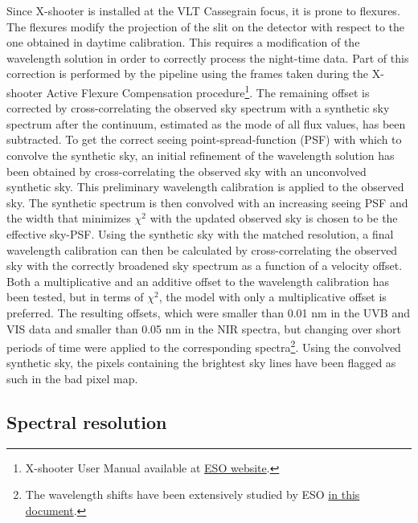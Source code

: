 \documentclass{aa}    %
\begin{document}
Since X-shooter is installed at the VLT Cassegrain focus, it is prone to
flexures. The flexures modify the projection of the slit on the detector with
respect to the one obtained in daytime calibration. This requires a modification
of the wavelength solution in order to correctly process the night-time data.
Part of this correction is performed by the pipeline using the frames taken
during the X-shooter Active Flexure Compensation procedure\footnote{X-shooter
	User Manual available at \href{https://www.eso.org/sci/facilities/paranal/instruments/xshooter/doc.html}{ESO website}.}. The
remaining offset is corrected by cross-correlating the observed sky spectrum
with a synthetic sky spectrum \citep{Noll2012, Jones2013} after the continuum,
estimated as the mode of all flux values, has been subtracted. To get the
correct seeing point-spread-function (PSF) with which to convolve the synthetic sky, an initial
refinement of the wavelength solution has been obtained by cross-correlating the
observed sky with an unconvolved synthetic sky. This preliminary wavelength
calibration is applied to the observed sky. The synthetic spectrum is then
convolved with an increasing seeing PSF and the width that minimizes $\chi^2$
with the updated observed sky is chosen to be the effective sky-PSF. Using the
synthetic sky with the matched resolution, a final wavelength calibration can
then be calculated by cross-correlating the observed sky with the correctly
broadened sky spectrum as a function of a velocity offset. Both a
multiplicative and an additive offset to the wavelength calibration has been
tested, but in terms of $\chi^2$, the model with only a multiplicative offset is
preferred. The resulting offsets, which were smaller than 0.01 nm in the UVB and
VIS data and smaller than 0.05 nm in the NIR spectra, but changing over short
periods of time were applied to the corresponding spectra\footnote{The
	wavelength shifts have been extensively studied by ESO
	\href{https://www.eso.org/sci/facilities/paranal/instruments/xshooter/doc/XS_wlc_shift_150615.pdf}{in this document}.}. Using the convolved synthetic sky, the pixels containing the brightest sky lines have been flagged as such in the bad pixel map.



\subsection{Spectral resolution} \label{resolution}
\end{document}
